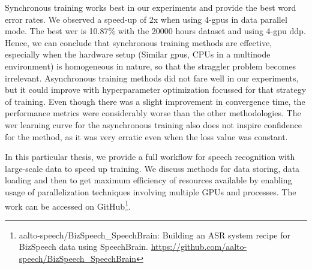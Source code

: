Synchronous training works best in our experiments and provide the best word error rates. We observed a speed-up of 2x when using 4-\acrshort{gpu}s in data parallel mode. The best \acrshort{wer} is 10.87\% with the 20000 hours dataset and using 4-\acrshort{gpu} \acrshort{ddp}. Hence, we can conclude that synchronous training methods are effective, especially when the hardware setup (Similar \acrshort{gpu}s, CPUs in a multinode environment) is homogeneous in nature, so that the straggler problem becomes irrelevant. Asynchronous training methods did not fare well in our experiments, but it could improve with hyperparameter optimization focussed for that strategy of training.  Even though there was a slight improvement in convergence time, the performance metrics were considerably worse than the other methodologies. The \acrshort{wer} learning curve for the asynchronous training also does not inspire confidence for the method, as it was very erratic even when the loss value was constant. 

In this particular thesis, we provide a full workflow for speech recognition with large-scale data to speed up training. We discuss methods for data storing, data loading and then to get maximum efficiency of resources available by enabling usage of parallelization techniques involving multiple GPUs and processes. The work can be accessed on GitHub\footnote{aalto-speech/BizSpeech\_SpeechBrain: Building an ASR system recipe for BizSpeech data using SpeechBrain. \href{https://github.com/aalto-speech/BizSpeech_SpeechBrain}{https://github.com/aalto-speech/BizSpeech\_SpeechBrain}}.